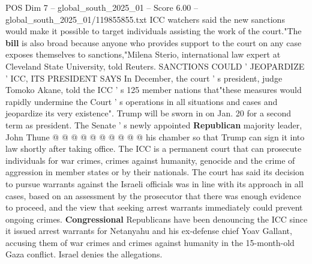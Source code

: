 \begin{textsample}{POS Dim 7 – global\_south\_2025\_01 – Score 6.00 – global\_south\_2025\_01/119855855.txt}
ICC watchers said the new sanctions would make it possible to target individuals assisting the work of the court."The \textbf{bill} is also broad because anyone who provides support to the court on any case exposes themselves to sanctions,"Milena Sterio, international law expert at Cleveland State University, told Reuters.
SANCTIONS COULD ' JEOPARDIZE ' ICC, ITS PRESIDENT SAYS In December, the court ' s president, judge Tomoko Akane, told the ICC ' s 125 member nations that"these measures would rapidly undermine the Court ' s operations in all situations and cases and jeopardize its very existence".
Trump will be sworn in on Jan. 20 for a second term as president.
The Senate ' s newly appointed \textbf{Republican} majority leader, John Thune @ @ @ @ @ @ @ @ @ @ his chamber so that Trump can sign it into law shortly after taking office.
The ICC is a permanent court that can prosecute individuals for war crimes, crimes against humanity, genocide and the crime of aggression in member states or by their nationals.
The court has said its decision to pursue warrants against the Israeli officials was in line with its approach in all cases, based on an assessment by the prosecutor that there was enough evidence to proceed, and the view that seeking arrest warrants immediately could prevent ongoing crimes. \textbf{Congressional} Republicans have been denouncing the ICC since it issued arrest warrants for Netanyahu and his ex-defense chief Yoav Gallant, accusing them of war crimes and crimes against humanity in the 15-month-old Gaza conflict.
Israel denies the allegations.

\end{textsample}
